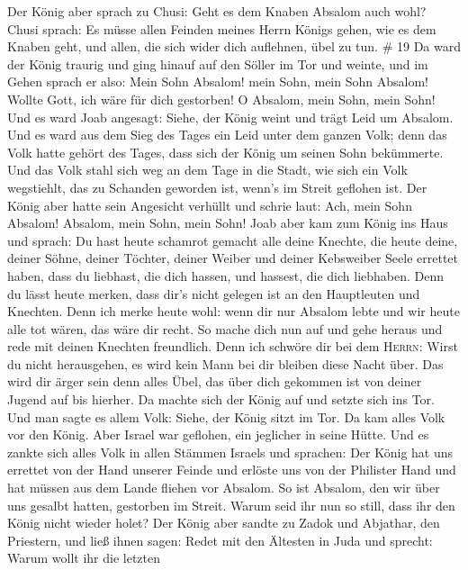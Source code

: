  Der König aber sprach zu Chusi: Geht es dem Knaben
Absalom auch wohl? Chusi sprach: Es müsse allen Feinden meines Herrn
Königs gehen, wie es dem Knaben geht, und allen, die sich wider dich
auflehnen, übel zu tun. \# 19  Da ward der König traurig
und ging hinauf auf den Söller im Tor und weinte, und im Gehen sprach er
also: Mein Sohn Absalom! mein Sohn, mein Sohn Absalom! Wollte Gott, ich
wäre für dich gestorben! O Absalom, mein Sohn, mein Sohn! 
Und es ward Joab angesagt: Siehe, der König weint und trägt Leid um
Absalom.  Und es ward aus dem Sieg des Tages ein Leid
unter dem ganzen Volk; denn das Volk hatte gehört des Tages, dass sich
der König um seinen Sohn bekümmerte.  Und das Volk stahl
sich weg an dem Tage in die Stadt, wie sich ein Volk wegstiehlt, das zu
Schanden geworden ist, wenn's im Streit geflohen ist.  Der
König aber hatte sein Angesicht verhüllt und schrie laut: Ach, mein Sohn
Absalom! Absalom, mein Sohn, mein Sohn!  Joab aber kam zum
König ins Haus und sprach: Du hast heute schamrot gemacht alle deine
Knechte, die heute deine, deiner Söhne, deiner Töchter, deiner Weiber
und deiner Kebsweiber Seele errettet haben,  dass du
liebhast, die dich hassen, und hassest, die dich liebhaben. Denn du
lässt heute merken, dass dir's nicht gelegen ist an den Hauptleuten und
Knechten. Denn ich merke heute wohl: wenn dir nur Absalom lebte und wir
heute alle tot wären, das wäre dir recht.  So mache dich
nun auf und gehe heraus und rede mit deinen Knechten freundlich. Denn
ich schwöre dir bei dem \textsc{Herrn}: Wirst du nicht herausgehen, es
wird kein Mann bei dir bleiben diese Nacht über. Das wird dir ärger sein
denn alles Übel, das über dich gekommen ist von deiner Jugend auf bis
hierher.  Da machte sich der König auf und setzte sich ins
Tor. Und man sagte es allem Volk: Siehe, der König sitzt im Tor. Da kam
alles Volk vor den König. Aber Israel war geflohen, ein jeglicher in
seine Hütte.  Und es zankte sich alles Volk in allen
Stämmen Israels und sprachen: Der König hat uns errettet von der Hand
unserer Feinde und erlöste uns von der Philister Hand und hat müssen aus
dem Lande fliehen vor Absalom.  So ist Absalom, den wir
über uns gesalbt hatten, gestorben im Streit. Warum seid ihr nun so
still, dass ihr den König nicht wieder holet?  Der König
aber sandte zu Zadok und Abjathar, den Priestern, und ließ ihnen sagen:
Redet mit den Ältesten in Juda und sprecht: Warum wollt ihr die letzten
